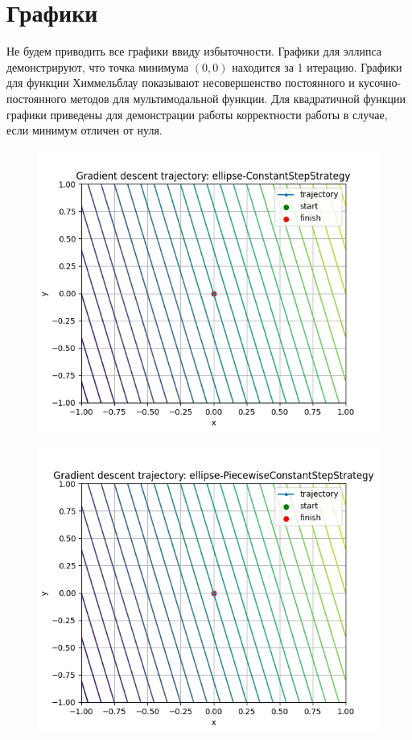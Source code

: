 \documentclass{article}
\begin{document}
\section{Графики}
Не будем приводить все графики ввиду избыточности. Графики для эллипса демонстрируют, что точка минимума $(0, 0)$ находится за 1 итерацию. Графики для функции Химмельблау показывают несовершенство постоянного и кусочно-постоянного методов для мультимодальной функции. Для квадратичной функции графики приведены для демонстрации работы корректности работы в случае, если минимум отличен от нуля.
\begin{figure}[H]
    \centering
    \includegraphics[width=1\linewidth]{ellipse-ConstantStepStrategy.png}
    \label{fig:enter-label}
\end{figure}
\begin{figure}[H]
    \centering
    \includegraphics[width=1\linewidth]{ellipse-PiecewiseConstantStepStrategy.png}
    \label{fig:enter-label}
\end{figure}
\end{document}
